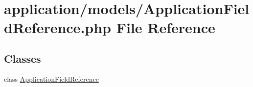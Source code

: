 \hypertarget{_application_field_reference_8php}{\section{application/models/\-Application\-Field\-Reference.php File Reference}
\label{_application_field_reference_8php}
}
\subsection*{Classes}
\begin{DoxyCompactItemize}
\item 
class \hyperlink{class_application_field_reference}{Application\-Field\-Reference}
\end{DoxyCompactItemize}
